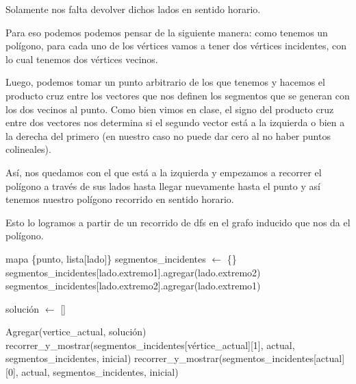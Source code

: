 Solamente nos falta devolver dichos lados en sentido horario.\newline

Para eso podemos podemos pensar de la siguiente manera: como tenemos un polígono, para cada uno de los vértices vamos a tener dos vértices incidentes, con lo cual tenemos dos vértices vecinos.\newline

Luego, podemos tomar un punto arbitrario de los que tenemos y hacemos el producto cruz entre los vectores que nos definen los segmentos que se generan con los dos vecinos al punto. Como bien vimos en clase, el signo del producto cruz entre dos vectores nos determina si el segundo vector está a la izquierda o bien a la derecha del primero (en nuestro caso no puede dar cero al no haber puntos colineales).\newline

Así, nos quedamos con el que está a la izquierda y empezamos a recorrer el polígono a través de sus lados hasta llegar nuevamente hasta el punto y así tenemos nuestro polígono recorrido en sentido horario.\newline    

Esto lo logramos a partir de un recorrido de dfs en el grafo inducido que nos da el polígono.\newline

\begin{algorithmic}

	\State mapa \{punto, lista[lado]\} segmentos_incidentes $\gets$ \{\}
		\State segmentos_incidentes[lado.extremo1].agregar(lado.extremo2)
		\State segmentos_incidentes[lado.extremo2].agregar(lado.extremo1)
	\EndFor 
\EndFunction
\end{algorithmic}


\begin{algorithmic}
\State solución $\gets$ []

	\State Agregar(vertice_actual, solución)
			\State recorrer_y_mostrar(segmentos_incidentes[vértice_actual][1], actual, segmentos_incidentes, inicial)
		\EndIf
	\Else
			\State recorrer_y_mostrar(segmentos_incidentes[actual][0], actual, segmentos_incidentes, inicial)
		\EndIf
	\EndIf
\EndFunction

\end{algorithmic}

